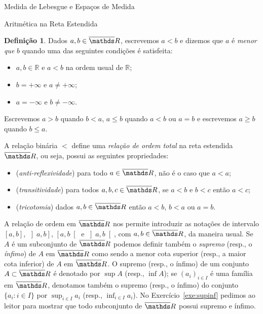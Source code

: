 \documentclass[oneside,final,11pt]{amsbook}
\newcommand{\R}{\mathds R}
\theoremstyle{remark}\newtheorem{exercise}{Exercício}[chapter]
\theoremstyle{remark}\newtheorem{*exercise}[exercise]{\hbox to 0pt{\hskip 0pt minus 1fil*}Exercício}
\theoremstyle{definition}\newtheorem{exdefin}{Definição}[chapter]
\theoremstyle{plain}\newtheorem{teo}{Teorema}[section]
\theoremstyle{plain}\newtheorem{lem}[teo]{Lema}
\theoremstyle{plain}\newtheorem{prop}[teo]{Proposição}
\theoremstyle{plain}\newtheorem{cor}[teo]{Corolário}
\theoremstyle{definition}\newtheorem{defin}[teo]{Definição}
\theoremstyle{remark}\newtheorem{rem}[teo]{Observação}
\theoremstyle{definition}\newtheorem{notation}[teo]{Notação}
\theoremstyle{definition}\newtheorem{convention}[teo]{Convenção}
\theoremstyle{definition}\newtheorem{example}[teo]{Exemplo}
\numberwithin{section}{chapter}
\numberwithin{equation}{section}
\begin{document}
\begin{chapter}{Medida de Lebesgue e Espaços de Medida}
\begin{section}{Aritmética na Reta Estendida}
\begin{defin}
Dados $a,b\in\overline\R$, escrevemos $a<b$ e dizemos que $a$ é {\em menor que\/} $b$ quando
uma das seguintes condições é satisfeita:
\begin{itemize}
\item $a,b\in\R$ e $a<b$ na ordem usual de $\R$;
\item $b=+\infty$ e $a\ne+\infty$;
\item $a=-\infty$ e $b\ne-\infty$.
\end{itemize}
Escrevemos $a>b$ quando $b<a$, $a\le b$ quando $a<b$ ou $a=b$ e escrevemos $a\ge b$ quando $b\le a$.
\end{defin}
A relação binária $<$ define uma {\em relação de ordem total\/}
na reta estendida $\overline\R$,
ou seja, possui as seguintes propriedades:
\begin{itemize}
\item ({\em anti-reflexividade})
para todo $a\in\overline\R$, não é o caso que $a<a$;
\item ({\em transitividade})
para todos $a,b,c\in\overline\R$, se $a<b$ e $b<c$ então $a<c$;
\item ({\em tricotomia}) dados $a,b\in\overline\R$ então $a<b$, $b<a$ ou $a=b$.
\end{itemize}
A relação de ordem em $\overline\R$ nos permite introduzir as notações de intervalo
$[a,b]$, $\left]a,b\right]$, $\left[a,b\right[$
e $\left]a,b\right[$, com $a,b\in\overline\R$, da maneira usual. Se $A$ é um subconjunto de $\overline\R$
podemos definir também o {\em supremo\/} (resp., o {\em ínfimo\/})
de $A$ em $\overline\R$ como sendo a menor cota superior (resp., a maior cota inferior) de $A$ em $\overline\R$.
O supremo (resp., o ínfimo) de um conjunto $A\subset\overline\R$ é denotado por $\sup A$\index[simbolos]{$\sup$} (resp., $\inf A$\index[simbolos]{$\inf$});
se $(a_i)_{i\in I}$ é uma família em $\overline\R$, denotamos também o supremo (resp., o ínfimo) do conjunto
$\{a_i:i\in I\}$ por $\sup_{i\in I}a_i$ (resp., $\inf_{i\in I}a_i$).
No Exercício~\ref{exe:supinf} pedimos ao leitor para mostrar que todo subconjunto de $\overline\R$
possui supremo e ínfimo.


\end{section}
\end{chapter}
\end{document}

